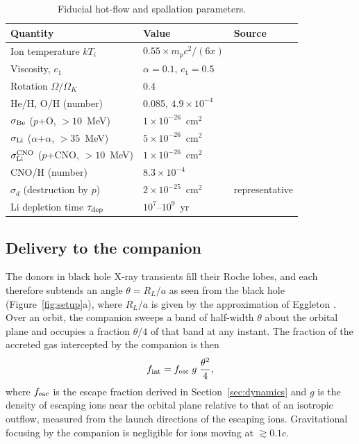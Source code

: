 \documentclass[twocolumn,showpacs,preprintnumbers,amsmath,amssymb]{revtex4}
\begin{document}
\begin{table}[t]
\caption{\label{tab:params} Fiducial hot-flow and spallation parameters.}
\begin{ruledtabular}
\begin{tabular}{lll}
Quantity & Value & Source \\
\hline
Ion temperature $kT_i$ & $0.55\times m_pc^2/(6x)$ & \cite{NMQ1998} \\
Viscosity, $c_1$ & $\alpha = 0.1$, $c_1=0.5$ & \cite{NMQ1998} \\
Rotation $\Omega/\Omega_K$ & 0.4 & \cite{NMQ1998} \\
He/H, O/H (number) & 0.085, $4.9\times10^{-4}$ & \cite{Asplund2009} \\
$\sigma_{\rm Be}$ ($p$+O, $>10$~MeV) & $1\times10^{-26}$~cm$^2$ & \cite{Doyle_2021} \\
$\sigma_{\rm Li}$ ($\alpha$+$\alpha$, $>35$~MeV) & $5\times10^{-26}$~cm$^2$ & \cite{ReadViola1984} \\
$\sigma_{\rm Li}^{\rm CNO}$ ($p$+CNO, $>10$~MeV) & $1\times10^{-26}$~cm$^2$ & \cite{Doyle_2021,ReadViola1984} \\
CNO/H (number) & $8.3\times10^{-4}$ & \cite{Asplund2009} \\
$\sigma_d$ (destruction by $p$) & $2\times10^{-25}$~cm$^2$ & representative \\
Li depletion time $\tau_{\rm dep}$ & $10^{7}$--$10^{9}$~yr & \cite{YiNarayan1997} \\
\end{tabular}
\end{ruledtabular}
\end{table}

\subsection{Delivery to the companion}

The donors in black hole X-ray transients fill their Roche lobes, and each therefore subtends an angle $\theta = R_L/a$ as seen from the black hole (Figure~\ref{fig:setup}a), where $R_L/a$ is given by the approximation of Eggleton \cite{Eggleton1983}. Over an orbit, the companion sweeps a band of half-width $\theta$ about the orbital plane and occupies a fraction $\theta/4$ of that band at any instant. The fraction of the accreted gas intercepted by the companion is then
\begin{equation}
\label{eq:fint}
f_{\rm int} = f_{\rm esc}\; g\; \frac{\theta^2}{4},
\end{equation}
where $f_{\rm esc}$ is the escape fraction derived in Section~\ref{sec:dynamics} and $g$ is the density of escaping ions near the orbital plane relative to that of an isotropic outflow, measured from the launch directions of the escaping ions. Gravitational focusing by the companion is negligible for ions moving at $\gtrsim0.1c$.
\end{document}
